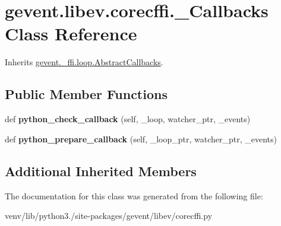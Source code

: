 \hypertarget{classgevent_1_1libev_1_1corecffi_1_1___callbacks}{}\section{gevent.\+libev.\+corecffi.\+\_\+\+Callbacks Class Reference}
\label{classgevent_1_1libev_1_1corecffi_1_1___callbacks}


Inherits \hyperlink{classgevent_1_1__ffi_1_1loop_1_1_abstract_callbacks}{gevent.\+\_\+ffi.\+loop.\+Abstract\+Callbacks}.

\subsection*{Public Member Functions}
\begin{DoxyCompactItemize}
\item 
\mbox{\label{classgevent_1_1libev_1_1corecffi_1_1___callbacks_ae275f866881f744027b2ab8e63d4c3dd}} 
def {\bfseries python\+\_\+check\+\_\+callback} (self, \+\_\+loop, watcher\+\_\+ptr, \+\_\+events)
\item 
\mbox{\label{classgevent_1_1libev_1_1corecffi_1_1___callbacks_adca463dba420c353c8ab1fb33f2a8cd8}} 
def {\bfseries python\+\_\+prepare\+\_\+callback} (self, \+\_\+loop\+\_\+ptr, watcher\+\_\+ptr, \+\_\+events)
\end{DoxyCompactItemize}
\subsection*{Additional Inherited Members}


The documentation for this class was generated from the following file\+:\begin{DoxyCompactItemize}
\item 
venv/lib/python3./site-\/packages/gevent/libev/corecffi.\+py\end{DoxyCompactItemize}
